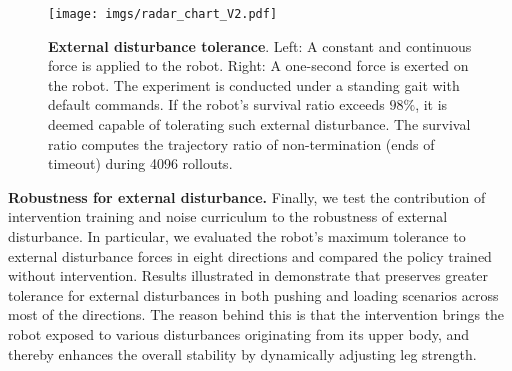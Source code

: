 \begin{figure}[t]
    \centering
    \texttt{[image: imgs/radar\_chart\_V2.pdf]}
    \vspace{-13pt}
    \caption{\small \textbf{External disturbance tolerance}. Left: A constant and continuous force is applied to the robot. Right: A one-second force is exerted on the robot. The experiment is conducted under a standing gait with default commands. If the robot's survival ratio exceeds $98\%$, it is deemed capable of tolerating such external disturbance. 
    The survival ratio computes the trajectory ratio of non-termination (ends of timeout) during 4096 rollouts.}
    \label{fig:Robust}
    \vspace{-12pt}
\end{figure}
\noindent\textbf{Robustness for external disturbance.}
Finally, we test the contribution of intervention training and noise curriculum to the robustness of external disturbance. In particular, we evaluated the robot's maximum tolerance to external disturbance forces in eight directions and compared the policy trained without intervention. Results illustrated in  demonstrate that \our preserves greater tolerance for external disturbances in both pushing and loading scenarios across most of the directions. The reason behind this is that the intervention brings the robot exposed to various disturbances originating from its upper body, and thereby enhances the overall stability by dynamically adjusting leg strength.



